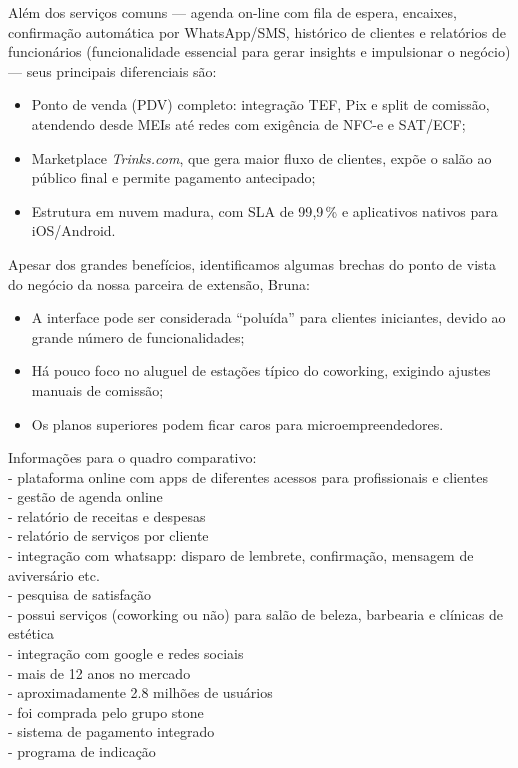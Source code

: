 Além dos serviços comuns — agenda on-line com fila de espera, encaixes, confirmação automática por
WhatsApp/SMS, histórico de clientes e relatórios de funcionários (funcionalidade essencial para
gerar insights e impulsionar o negócio) — seus principais diferenciais são:

\begin{itemize}
	\item Ponto de venda (PDV) completo: integração TEF, Pix e split de comissão, atendendo desde
	MEIs até redes com exigência de NFC-e e SAT/ECF;
	\item Marketplace \textit{Trinks.com}, que gera maior fluxo de clientes, expõe o salão ao
	público final e permite pagamento antecipado;
	\item Estrutura em nuvem madura, com SLA de 99{,}9\,\% e aplicativos nativos para
	iOS/Android.
\end{itemize}

Apesar dos grandes benefícios, identificamos algumas brechas do ponto de vista do negócio da nossa
parceira de extensão, Bruna:

\begin{itemize}
	\item A interface pode ser considerada “poluída” para clientes iniciantes, devido ao grande
	número de funcionalidades;
	\item Há pouco foco no aluguel de estações típico do coworking, exigindo ajustes manuais de
	comissão;
	\item Os planos superiores podem ficar caros para microempreendedores.
\end{itemize}

Informações para o quadro comparativo:\\

- plataforma online com apps de diferentes acessos para profissionais e clientes\\
- gestão de agenda online\\
- relatório de receitas e despesas\\
- relatório de serviços por cliente\\
- integração com whatsapp: disparo de lembrete, confirmação, mensagem de aviversário etc.\\
- pesquisa de satisfação \\
- possui serviços  (coworking ou não) para salão de beleza, barbearia e clínicas de estética \\
- integração com google e redes sociais\\
- mais de 12 anos no mercado \\
- aproximadamente 2.8 milhões de usuários\\
- foi comprada pelo grupo stone\\
- sistema de pagamento integrado\\
- programa de indicação


